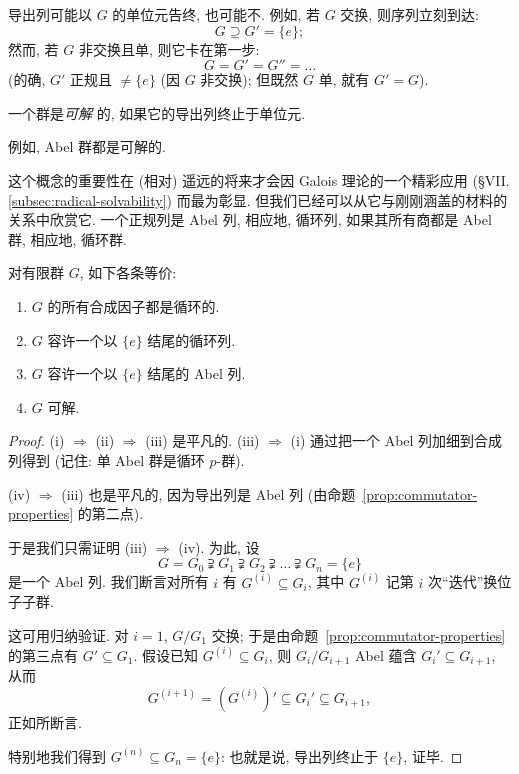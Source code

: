 导出列可能以 $G$ 的单位元告终, 也可能不. 例如, 若 $G$ 交换, 则序列立刻到达:
\[
G \supseteq G' = \{e\};
\]
然而, 若 $G$ 非交换且单, 则它卡在第一步:
\[
G = G' = G'' = \dots
\]
(的确, $G'$ 正规且 $\neq \{e\}$ (因 $G$ 非交换); 但既然 $G$ 单, 就有 $G' = G$).

\begin{definition}
\label{def:solvable}
一个群是\emph{可解}%
的, 如果它的导出列终止于单位元.
\end{definition}

例如, Abel 群都是可解的.

这个概念的重要性在 (相对) 遥远的将来才会因 Galois 理论的一个精彩应用 (\S VII.\ref{subsec:radical-solvability}) 而最为彰显. 但我们已经可以从它与刚刚涵盖的材料的关系中欣赏它. 一个正规列是 Abel 列, 相应地, 循环列, 如果其所有商都是 Abel 群, 相应地, 循环群.

\begin{proposition}
\label{prop:solvable-equiv}
对有限群 $G$, 如下各条等价:
\begin{enumerate}[label=(\roman*)]
\item $G$ 的所有合成因子都是循环的.
\item $G$ 容许一个以 $\{e\}$ 结尾的循环列.
\item $G$ 容许一个以 $\{e\}$ 结尾的 Abel 列.
\item $G$ 可解.
\end{enumerate}
\end{proposition}

\begin{proof}
(i) $\Longrightarrow$ (ii) $\Longrightarrow$ (iii) 是平凡的. (iii) $\Longrightarrow$ (i) 通过把一个 Abel 列加细到合成列得到 (记住: 单 Abel 群是循环 $p$-群).

(iv) $\Longrightarrow$ (iii) 也是平凡的, 因为导出列是 Abel 列 (由命题~\ref{prop:commutator-properties} 的第二点).

于是我们只需证明 (iii) $\Longrightarrow$ (iv). 为此, 设
\[
G = G_0 \supsetneqq G_1 \supsetneqq G_2 \supsetneqq \dots \supsetneqq G_n = \{e\}
\]
是一个 Abel 列. 我们断言对所有 $i$ 有 $G^{(i)} \subseteq G_i$, 其中 $G^{(i)}$ 记第 $i$ 次``迭代''换位子子群.

这可用归纳验证. 对 $i = 1$, $G/G_1$ 交换; 于是由命题~\ref{prop:commutator-properties} 的第三点有 $G' \subseteq G_1$. 假设已知 $G^{(i)} \subseteq G_i$, 则 $G_i/G_{i+1}$ Abel 蕴含 $G_i' \subseteq G_{i+1}$, 从而
\[
G^{(i+1)} = (G^{(i)})' \subseteq G_i' \subseteq G_{i+1},
\]
正如所断言.

特别地我们得到 $G^{(n)} \subseteq G_n = \{e\}$: 也就是说, 导出列终止于 $\{e\}$, 证毕.
\end{proof}

